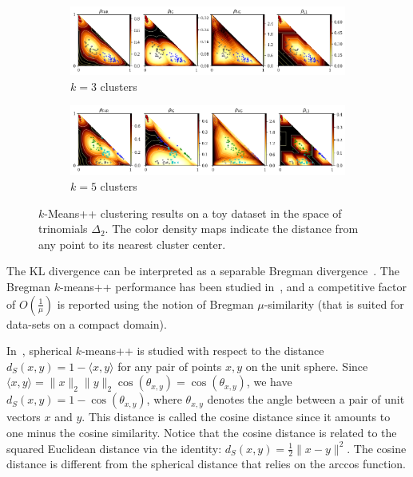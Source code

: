 \documentclass[graybox]{svmult}
\def\inner#1#2{ \langle {#1},{#2} \rangle }
\begin{document}
\begin{figure}[t]
\centering
\begin{subfigure}{\textwidth}
\includegraphics[width=\textwidth]{plusplus3}
\caption{$k=3$ clusters}
\end{subfigure}
\begin{subfigure}{\textwidth}
\includegraphics[width=\textwidth]{plusplus5}
\caption{$k=5$ clusters}
\end{subfigure}
\caption{$k$-Means++ clustering results on a toy dataset in the space of trinomials $\Delta_2$.
The color density maps indicate the distance from any point to its nearest cluster center.}\label{fig:kmresults}
\end{figure}

The KL divergence can be interpreted as a separable Bregman divergence~\cite{BregmanKmeans-2010}.
The Bregman $k$-means++ performance has been studied in~\cite{BregmanKmeans-2010,smoothedBregmankMeans-2013},
and a competitive factor of $O(\frac{1}{\mu})$ is reported using the notion of Bregman $\mu$-similarity (that is suited for data-sets on a compact domain).

In~\cite{sphericalkm-2015}, spherical $k$-means++ is studied with respect to the distance $d_S(x,y)=1-\inner{x}{y}$ for any pair of points $x,y$ on the unit sphere. 
Since $\inner{x}{y}=\|x\|_2 \|y\|_2 \cos(\theta_{x,y})=\cos(\theta_{x,y})$, we have  $d_S(x,y)=1-\cos(\theta_{x,y})$, where $\theta_{x,y}$ 
denotes the angle between a pair of unit vectors $x$ and $y$. This distance is called the cosine distance since it amounts to one minus the cosine similarity.
Notice that the cosine distance is related to the squared Euclidean distance via the identity: $d_S(x,y)=\frac{1}{2}\|x-y\|^2$.
The cosine distance is different from the spherical distance that relies on the arccos function.
\end{document}
